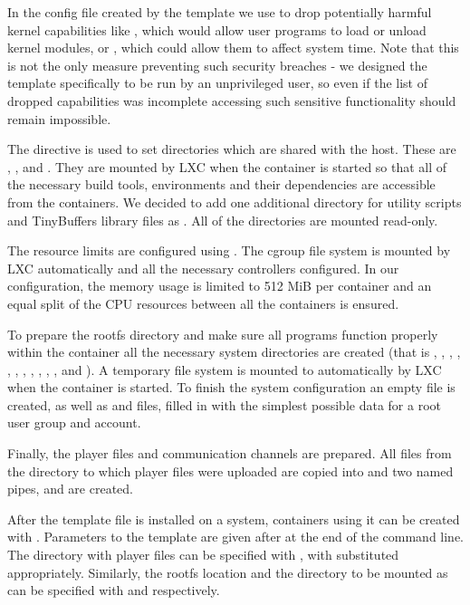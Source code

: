 In the config file created by the  template we use
 to drop potentially harmful kernel capabilities
\cite{capabilities} like , which would allow user programs
to load or unload kernel modules, or , which could allow
them to affect system time. Note that this is not the only measure preventing
such security breaches - we designed the template specifically to be run by an
unprivileged user, so even if the list of dropped capabilities was incomplete
accessing such sensitive functionality should remain impossible.

The  directive is used to set directories which are shared
with the host.  These are , ,  and . They
are mounted by LXC when the container is started so that all of the necessary
build tools, environments and their dependencies are accessible from the
containers. We decided to add one additional directory for utility scripts and
TinyBuffers library files as . All of the directories are mounted
read-only.

The resource limits are configured using . The cgroup file system
is mounted by LXC automatically and all the necessary controllers configured.
In our configuration, the memory usage is limited to 512 MiB per container and
an equal split of the CPU resources between all the containers is ensured.


To prepare the rootfs directory and make sure all programs function properly
within the container all the necessary system directories are created (that is
, , , , , , ,
, , , ,  and ). A
temporary file system is mounted to  automatically by LXC when the
container is started. To finish the system configuration an empty
 file is created, as well as  and
 files, filled in with the simplest possible data for a root
user group and account.

Finally, the player files and communication channels are prepared. All files
from the directory to which player files were uploaded are copied into
 and two named pipes,  and 
are created.

After the template file is installed on a system, containers using it can be
created with . Parameters to the
template are given after \tw{--} at the end of the command line. The directory
with player files can be specified with , with
 substituted appropriately. Similarly, the rootfs location and the
directory to be mounted as  can be specified with
 and  respectively.

